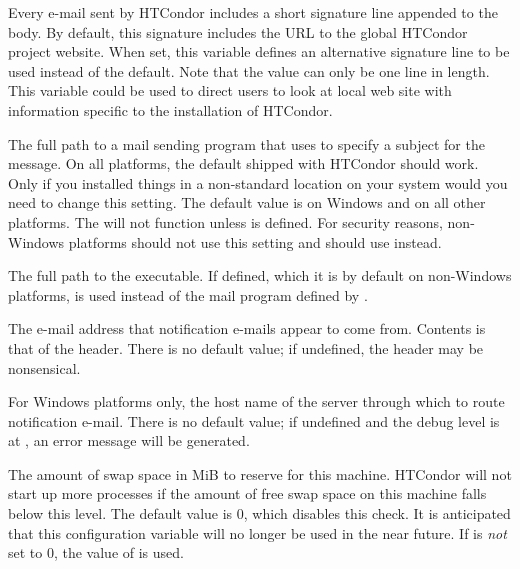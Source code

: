 \begin{description}
\label{param:EmailSignature}
\item[\Macro{EMAIL\_SIGNATURE}]
  Every e-mail sent by HTCondor includes a short signature line appended
  to the body.  By default, this signature includes the URL to the
  global HTCondor project website.  
  When set, this variable defines an alternative signature line to be
  used instead of the default. 
  Note that the value can only be one line in length.
  This variable could be used to direct users
  to look at local web site with information specific to the installation
  of HTCondor.

\label{param:Mail}
\item[\Macro{MAIL}]
  The full path to a mail
  sending program that uses  to specify a subject for the
  message.  On all platforms, the default shipped with HTCondor should
  work.  Only if you installed things in a non-standard location on
  your system would you need to change this setting.
  The default value is  on Windows
  and  on all other platforms.
  The  will not
  function unless  is defined.
  For security reasons, non-Windows platforms should not use this setting
  and should use  instead.

\label{param:Sendmail}
\item[\Macro{SENDMAIL}]
  The full path to the  executable.  
  If defined, which it is by default on non-Windows platforms,
   is used instead of the mail program defined by .

\label{param:MailFrom}
\item[\Macro{MAIL\_FROM}]
  The e-mail address that notification e-mails appear to come from.
  Contents is that of the  header.
  There is no default value; if undefined, the  header may
  be nonsensical.

\label{param:SMTPServer}
\item[\Macro{SMTP\_SERVER}]
  For Windows platforms only, the host name of the server through which
  to route notification e-mail.
  There is no default value; if undefined and the debug level is
  at  , an error message will be generated.

\label{param:ReservedSwap}
\item[\Macro{RESERVED\_SWAP}]
  The amount of swap space in MiB to reserve for this machine.
  HTCondor will not start up more  processes if the
  amount of free swap space on this machine falls below this level.
  The default value is 0, which disables this check.
  It is anticipated that this configuration variable will no longer
  be used in the near future.
  If  is \emph{not} set to 0,
  the value of  is used.


\end{description}
